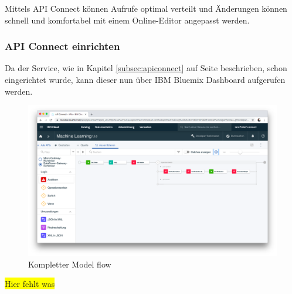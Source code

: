 Mittels API Connect können Aufrufe optimal verteilt und Änderungen können schnell und komfortabel mit einem Online-Editor
angepasst werden.

\subsubsection{API Connect einrichten}
Da der Service, wie in Kapitel \ref{subsec:apiconnect} auf Seite \pageref{subsec:apiconnect} beschrieben, schon
eingerichtet wurde, kann dieser nun über IBM Bluemix Dashboard aufgerufen werden.

\begin{figure}[h]
    \centering
    \includegraphics[scale=0.26]{images/kapitel_3/api_connect.png}
    \caption{Kompletter Model flow}
    \label{fig:umsetzung_api_connect}
\end{figure}

\colorbox{yellow}{Hier fehlt was}